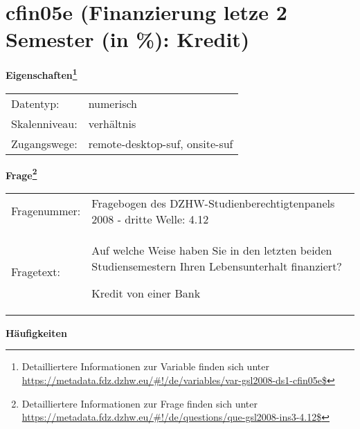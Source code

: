 
    \setcounter{footnote}{0}

    \vspace*{-1.8cm}
	\section{cfin05e (Finanzierung letze 2 Semester (in \%): Kredit)}
	\label{section:cfin05e}



    \vspace*{0.5cm}
    \noindent\textbf{Eigenschaften\footnote{Detailliertere Informationen zur Variable finden sich unter
		\url{https://metadata.fdz.dzhw.eu/\#!/de/variables/var-gsl2008-ds1-cfin05e$}}}\\
	\begin{tabularx}{\hsize}{@{}lX}
	Datentyp: & numerisch \\
	Skalenniveau: & verhältnis \\
	Zugangswege: &
	  remote-desktop-suf, 
	  onsite-suf
 \\
    \end{tabularx}



				\vspace*{0.5cm}
                \noindent\textbf{Frage\footnote{Detailliertere Informationen zur Frage finden sich unter
		              \url{https://metadata.fdz.dzhw.eu/\#!/de/questions/que-gsl2008-ins3-4.12$}}}\\
				\begin{tabularx}{\hsize}{@{}lX}
					Fragenummer: &
					  Fragebogen des DZHW-Studienberechtigtenpanels 2008 - dritte Welle:
					  4.12
 \\
					Fragetext: & Auf welche Weise haben Sie in den letzten beiden Studiensemestern Ihren Lebensunterhalt finanziert?\par  Kredit von einer Bank \\
				\end{tabularx}





        		\vspace*{0.5cm}
                \noindent\textbf{Häufigkeiten}

